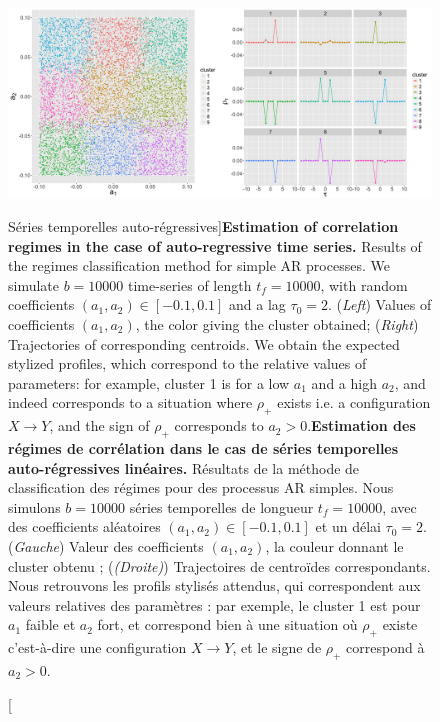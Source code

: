 
\begin{figure}
	\includegraphics[width=\linewidth]{Figures/Final/4-2-2-fig-causalityregimes-arma.jpg}
	\caption[Auto-regressive time-series][Séries temporelles auto-régressives]{\textbf{Estimation of correlation regimes in the case of auto-regressive time series.} Results of the regimes classification method for simple AR processes. We simulate $b=10000$ time-series of length $t_f=10000$, with random coefficients $(a_1,a_2) \in [-0.1,0.1]$ and a lag $\tau_0 = 2$. (\textit{Left}) Values of coefficients $(a_1,a_2)$, the color giving the cluster obtained; (\textit{Right}) Trajectories of corresponding centroids. We obtain the expected stylized profiles, which correspond to the relative values of parameters: for example, cluster 1 is for a low $a_1$ and a high $a_2$, and indeed corresponds to a situation where $\rho_+$ exists i.e. a configuration $X\rightarrow Y$, and the sign of $\rho_+$ corresponds to $a_2 >0$.\label{fig:causalityregimes:arma}}{\textbf{Estimation des régimes de corrélation dans le cas de séries temporelles auto-régressives linéaires.} Résultats de la méthode de classification des régimes pour des processus AR simples. Nous simulons $b = 10000$ séries temporelles de longueur $t_f = 10000$, avec des coefficients aléatoires $(a_1,a_2) \in [-0.1,0.1]$ et un délai $\tau_0 = 2$. (\textit{Gauche}) Valeur des coefficients $(a_1,a_2)$, la couleur donnant le cluster obtenu ; (\textit{(Droite)}) Trajectoires de centroïdes correspondants. Nous retrouvons les profils stylisés attendus, qui correspondent aux valeurs relatives des paramètres : par exemple, le cluster 1 est pour $a_1$ faible et $a_2$ fort, et correspond bien à une situation où $\rho_+$ existe c'est-à-dire une configuration $X\rightarrow Y$, et le signe de $\rho_+$ correspond à $a_2 >0$. \label{fig:causalityregimes:arma}}
\end{figure}




